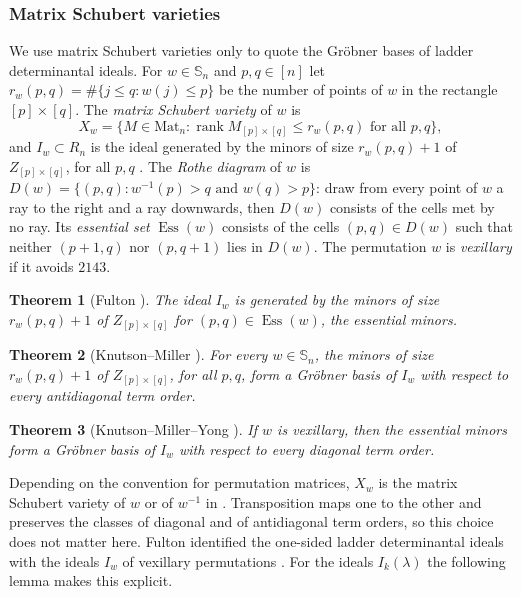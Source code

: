 \documentclass[11pt]{amsart}
\newtheorem{theorem}{Theorem}[section]
\theoremstyle{definition}
\theoremstyle{remark}
\newcommand{\bS}{\mathbb{S}}
\newcommand{\Mat}{\mathrm{Mat}}
\newcommand{\Ess}{\operatorname{Ess}}
\begin{document}
\subsubsection{Matrix Schubert varieties}
We use matrix Schubert varieties only to quote the Gr\"obner bases of ladder determinantal ideals. For $w\in\bS_n$ and $p,q\in[n]$ let $r_w(p,q)=\#\{j\le q:w(j)\le p\}$ be the number of points of $w$ in the rectangle $[p]\times[q]$. The \emph{matrix Schubert variety} of $w$ is
\[
X_w=\bigl\{M\in\Mat_n:\operatorname{rank}M_{[p]\times[q]}\le r_w(p,q)\text{ for all }p,q\bigr\},
\]
and $I_w\subset R_n$ is the ideal generated by the minors of size $r_w(p,q)+1$ of $Z_{[p]\times[q]}$, for all $p,q$ \cite{Fulton}. The \emph{Rothe diagram} of $w$ is $D(w)=\{(p,q):w^{-1}(p)>q\text{ and }w(q)>p\}$: draw from every point of $w$ a ray to the right and a ray downwards, then $D(w)$ consists of the cells met by no ray. Its \emph{essential set} $\Ess(w)$ consists of the cells $(p,q)\in D(w)$ such that neither $(p+1,q)$ nor $(p,q+1)$ lies in $D(w)$. The permutation $w$ is \emph{vexillary} if it avoids $2143$.

\begin{theorem}[Fulton \cite{Fulton}]\label{thm:fulton}
The ideal $I_w$ is generated by the minors of size $r_w(p,q)+1$ of $Z_{[p]\times[q]}$ for $(p,q)\in\Ess(w)$, the \emph{essential minors}.
\end{theorem}

\begin{theorem}[Knutson--Miller {\cite[Theorem~B]{KM}}]\label{thm:KM}
For every $w\in\bS_n$, the minors of size $r_w(p,q)+1$ of $Z_{[p]\times[q]}$, for all $p,q$, form a Gr\"obner basis of $I_w$ with respect to every antidiagonal term order.
\end{theorem}

\begin{theorem}[Knutson--Miller--Yong {\cite[Theorem~3.8]{KMY}}]\label{thm:KMY}
If $w$ is vexillary, then the essential minors form a Gr\"obner basis of $I_w$ with respect to every diagonal term order.
\end{theorem}

Depending on the convention for permutation matrices, $X_w$ is the matrix Schubert variety of $w$ or of $w^{-1}$ in \cite{KM,KMY}. Transposition maps one to the other and preserves the classes of diagonal and of antidiagonal term orders, so this choice does not matter here. Fulton identified the one-sided ladder determinantal ideals with the ideals $I_w$ of vexillary permutations \cite[Section~2.4]{KM}. For the ideals $I_k(\lambda)$ the following lemma makes this explicit.
\end{document}
